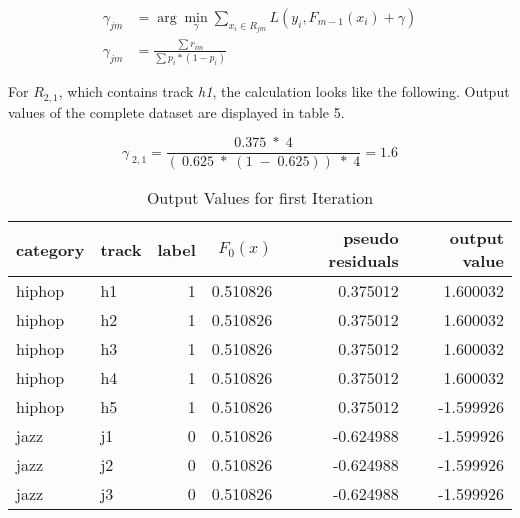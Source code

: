 \begin{equation}
    \begin{aligned}
        \gamma_{jm} &= \arg \min_{\gamma}\sum_{x_{i} \in R_{jm}} L(y_{i},F_{m-1}(x_{i}) + \gamma)
        \\
        \gamma_{jm} &= \frac{ \sum r_{im}}{\sum p_{i} * (1 - p_{i})}
        \label{equ:gb_output_value_theory}
    \end{aligned}
\end{equation}

For \(R_{2,1}\), which contains track \emph{h1}, the calculation looks like the following. Output values of the complete 
dataset are displayed in table 5.%

\begin{equation*}
\gamma_{\;2,1} = \frac{0.375\;*\;4}{(\:0.625\;*\;(1\;-\;0.625))\;*\;4} = 1.6 
\end{equation*}

\begin{table}[H]
    \centering
    \begin{tabular}{llrrrr}
        \toprule
        category & track &  label &  \(F_{0}(x)\) &  pseudo residuals &  output value \\
        \midrule
          hiphop &    h1 &      1 & 0.510826 &            0.375012 &        1.600032 \\
          hiphop &    h2 &      1 & 0.510826 &            0.375012 &        1.600032 \\
          hiphop &    h3 &      1 & 0.510826 &            0.375012 &        1.600032 \\
          hiphop &    h4 &      1 & 0.510826 &            0.375012 &        1.600032 \\
          hiphop &    h5 &      1 & 0.510826 &            0.375012 &       -1.599926 \\
            jazz &    j1 &      0 & 0.510826 &           -0.624988 &       -1.599926 \\
            jazz &    j2 &      0 & 0.510826 &           -0.624988 &       -1.599926 \\
            jazz &    j3 &      0 & 0.510826 &           -0.624988 &       -1.599926 \\
        \bottomrule
        \end{tabular}
    \caption{Output Values for first Iteration}%
    \label{tbl:theory_output_values_1_iteration}%
  \end{table} 

